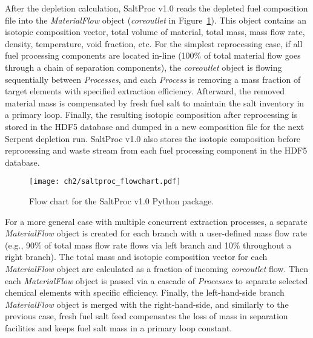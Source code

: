 After the depletion calculation, SaltProc v1.0 reads the depleted fuel 
composition file into the \textit{MaterialFlow} object 
(\textit{core\textunderscore outlet} in Figure~\ref{fig:saltproc_flow}). This 
object contains an isotopic composition vector, total volume of material, 
total mass, mass flow rate, density, temperature, void fraction, etc. For the 
simplest reprocessing case, if all fuel processing components are located 
in-line (100\% of total material flow goes through a chain of separation 
components), the \textit{core\textunderscore outlet} object is flowing 
sequentially between \textit{Processes}, and each \textit{Process} is removing 
a mass fraction of target elements with specified extraction efficiency. 
Afterward, the removed material mass is compensated by fresh fuel salt to 
maintain the salt inventory in a primary loop. Finally, the resulting isotopic 
composition after reprocessing is stored in the HDF5 database and dumped in a 
new composition file for the next Serpent depletion run. SaltProc v1.0 also 
stores the isotopic composition before reprocessing and waste stream from each 
fuel processing component in the HDF5 database. 
\begin{figure}[ht!] %
	\centering
	\texttt{[image: ch2/saltproc\_flowchart.pdf]}
	\vspace{-0.15in}
	\caption{Flow chart for the SaltProc v1.0 Python package.}
	\label{fig:saltproc_flow}
\end{figure}

For a more general case with multiple concurrent extraction processes, a 
separate \textit{MaterialFlow} object is created for each branch with a 
user-defined mass flow rate (e.g., 90\% of total mass flow rate flows via left 
branch and 10\% throughout a right branch). The total mass and isotopic 
composition vector for each \textit{MaterialFlow} object are calculated as a 
fraction of incoming \textit{core\textunderscore outlet} flow. Then each 
\textit{MaterialFlow} object is passed via a cascade of \textit{Processes} to 
separate selected chemical elements with specific efficiency. Finally, the 
left-hand-side branch \textit{MaterialFlow} object is merged with the 
right-hand-side, and similarly to the previous case, fresh fuel salt feed 
compensates the loss of mass in separation facilities and keeps fuel salt mass 
in a primary loop constant.


